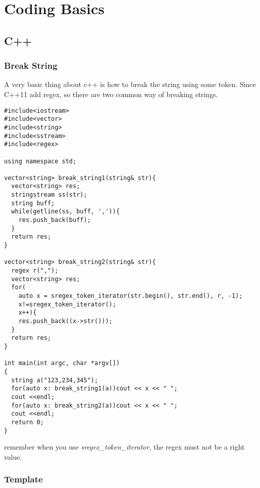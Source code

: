 \newpage
\section{Coding Basics}
\subsection{C++}

\subsubsection{Break String}
A very basic thing about c++ is how to break the string using some token. Since C++11 add regex, so there are two common way of breaking strings.

\begin{lstlisting}
#include<iostream>
#include<vector>
#include<string>
#include<sstream>
#include<regex>

using namespace std;

vector<string> break_string1(string& str){
  vector<string> res;
  stringstream ss(str);
  string buff;
  while(getline(ss, buff, ',')){
    res.push_back(buff);
  }
  return res;
}

vector<string> break_string2(string& str){
  regex r(",");
  vector<string> res;
  for(
    auto x = sregex_token_iterator(str.begin(), str.end(), r, -1);
    x!=sregex_token_iterator();
    x++){
    res.push_back((x->str()));
  }
  return res;
}

int main(int argc, char *argv[])
{
  string a("123,234,345");
  for(auto x: break_string1(a))cout << x << " ";
  cout <<endl;
  for(auto x: break_string2(a))cout << x << " ";
  cout <<endl;
  return 0;
}
\end{lstlisting}

remember when you use \textit{sregex\_token\_iterator}, the {\color{blue}regex must not be a right value}.


\subsubsection{Template}

